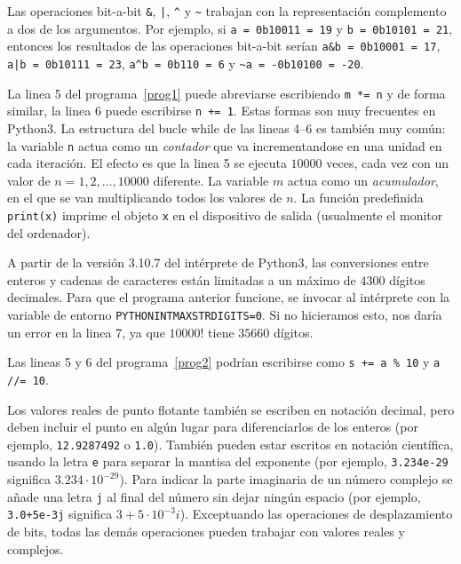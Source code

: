 \documentclass[a4paper, 11pt]{article}
\theoremstyle{plain}
\theoremstyle{definition}
\begin{document}
\bigskip

Las operaciones bit-a-bit \texttt{\&}, \texttt{|}, \texttt{\^} y \texttt{\~}
trabajan con la representación complemento a dos de los argumentos. Por ejemplo,
si \texttt{a = 0b10011 = 19} y \texttt{b = 0b10101 = 21}, entonces los resultados
de las operaciones bit-a-bit serían \texttt{a\&b = 0b10001 = 17},
\texttt{a|b = 0b10111 = 23}, \texttt{a\^{}b = 0b110 = 6} y
\texttt{\~{}a = -0b10100 = -20}.

\bigskip



\bigskip

La linea 5 del programa~\ref{prog1} puede abreviarse escribiendo \texttt{m *= n}
y de forma similar, la linea 6 puede escribirse \texttt{n += 1}. Estas formas son
muy frecuentes en Python3. La estructura del bucle while de las lineas 4--6 es
también muy común: la variable \texttt{n} actua como un \textit{contador} que va
incrementandose en una unidad en cada iteración. El efecto es que la linea 5
se ejecuta $10000$ veces, cada vez con un valor de $n=1,2,\ldots,10000$ diferente.
La variable $m$ actua como un \textit{acumulador}, en el que se van multiplicando
todos los valores de $n$. La función predefinida \texttt{print(x)} imprime el
objeto \texttt{x} en el dispositivo de salida (usualmente el monitor del
ordenador).

\bigskip

A partir de la versión 3.10.7 del intérprete de Python3, las conversiones entre enteros
y cadenas de caracteres están limitadas a un máximo de $4300$ dígitos decimales. Para que
el programa anterior funcione, se invocar al intérprete con la variable de entorno
\texttt{PYTHONINTMAXSTRDIGITS=0}. Si no hicieramos esto, nos daría un error en la
linea 7, ya que $10000!$ tiene $35660$ dígitos.

\bigskip



\bigskip

Las lineas 5 y 6 del programa~\ref{prog2} podrían escribirse como
\texttt{s += a \% 10} y \texttt{a //= 10}.

\bigskip

Los valores reales de punto flotante también se escriben en notación decimal,
pero deben incluir el punto en algún lugar para diferenciarlos de los enteros
(por ejemplo, \texttt{12.9287492} o \texttt{1.0}). También pueden estar escritos
en notación científica, usando la letra \texttt{e} para separar la mantisa del
exponente (por ejemplo, \texttt{3.234e-29} significa $3.234\cdot 10^{-29}$).
Para indicar la parte imaginaria de un número complejo se añade una letra
\texttt{j} al final del número sin dejar ningún espacio (por ejemplo,
\texttt{3.0+5e-3j} significa $3+5\cdot 10^{-3}i$). Exceptuando las operaciones
de desplazamiento de bits, todas las demás operaciones pueden trabajar con
valores reales y complejos.
\end{document}
